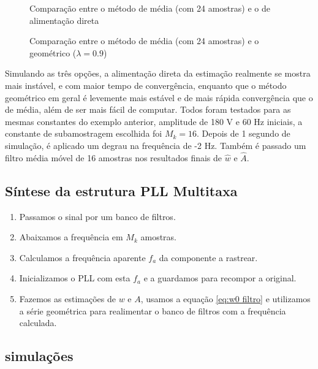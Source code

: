 \documentclass[a4paper, 12pt]{book}
\begin{document}
\begin{figure}[h]
	\centering    
	\def\svgscale{1}
	
	\caption{Comparação entre o método de média (com 24 amostras) e o de alimentação direta}
	\label{fig:esquema_pll}
\end{figure}

\begin{figure}[h]
	\centering    
	\def\svgscale{1}
	
	\caption{Comparação entre o método de média (com 24 amostras) e o geométrico ($\lambda=0.9$)}
	\label{fig:esquema_pll}
\end{figure}

\indent Simulando as três opções, a alimentação direta da estimação realmente se mostra mais instável, e com maior tempo de convergência, enquanto que o método geométrico em geral é levemente mais estável e de mais rápida convergência que o de média, além de ser mais fácil de computar. Todos foram testados para as mesmas constantes do exemplo anterior, amplitude de 180 V e 60 Hz iniciais, a constante de subamostragem escolhida foi $M_k=16$. Depois de 1 segundo de simulação, é aplicado um degrau na frequência de -2 Hz. Também é passado um filtro média móvel de 16 amostras nos resultados finais de $\hat{w}$ e $\hat{A}$.

\subsection{Síntese da estrutura PLL Multitaxa}

\begin{enumerate}
	\item Passamos o sinal por um banco de filtros.
	\item Abaixamos a frequência em $M_k$ amostras.
	\item Calculamos a frequência aparente $f_a$ da componente a rastrear.
	\item Inicializamos o PLL com esta $f_a$ e a guardamos para recompor a original.
	\item Fazemos as estimações de $w$ e $A$, usamos a equação \ref{eq:w0 filtro} e utilizamos a série geométrica para realimentar o banco de filtros com a frequência calculada.
\end{enumerate}

\subsection{simulações}
\end{document}
